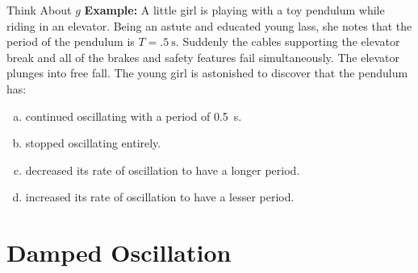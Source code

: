 \documentclass[12pt,compress,aspectratio=169]{beamer}
\begin{document}
\begin{frame}{Think About $g$}
  \textbf{Example:} A little girl is playing with a toy pendulum while riding
  in an elevator. Being an astute and educated young lass, she notes that the 
  period of the pendulum is $T=\SI{.5}{\second}$. Suddenly the cables
  supporting the elevator break and all  of the brakes and safety features fail
  simultaneously. The elevator plunges into free fall. The young girl is
  astonished to discover that the pendulum has:
  \begin{enumerate}[(a)]
  \item continued oscillating with a period of \SI{.5}{\second}.
  \item stopped oscillating entirely.
  \item decreased its rate of oscillation to have a longer period.
  \item increased its rate of oscillation to have a lesser period.
  \end{enumerate}
\end{frame}



\section{Damped Oscillation}
\end{document}
